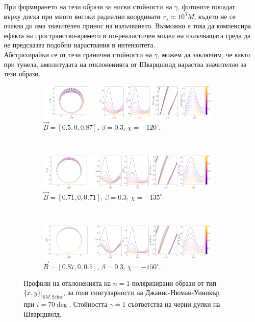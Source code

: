 При формирането на тези образи за ниски стойности на $\gamma$, фотоните попадат върху диска при много високи радиални координати $r_s\approx 10^3M$, където не се очаква да има значителен принос на излъчването. Възможно е това да компенсира ефекта на пространство-времето и по-реалистичен модел на излъчващата среда да \emph{не} предсказва подобни нараствания в интензитета. \\

Абстрахирайки се от тези гранични стойности на $\gamma$, можем да заключим, че както при тунела, амплитудата на отклоненията от Шварцшилд нараства значително за тези образи. 

\begin{figure}[!htb]
	\centering
	\begin{subfigure}{12cm}
		\hspace{-0.25cm}
		\includegraphics[scale = 0.13]{JNW_delta_fig_B_0.5_0.87_0_20_deg_r6_n1.png}
		\caption{$\vec{B} = [0.5, 0, 0.87]$, $\beta = 0.3$, $\chi = -120^\circ$.}
	\end{subfigure}\\
	\begin{subfigure}{12cm}
		\hspace{-0.25cm}
		\includegraphics[scale = 0.13]{JNW_delta_fig_B_0.71_0.71_0_20_deg_r6_n1.png}
		\caption{$\vec{B} = [0.71, 0, 0.71]$, $\beta = 0.3$, $\chi = -135^\circ$.}
	\end{subfigure}\\
	\begin{subfigure}{12cm}
		\hspace{-0.25cm}
		\includegraphics[scale = 0.13]{JNW_delta_fig_B_0.87_0.5_0_20_deg_r6_n1.png}
		\caption{$\vec{B} = [0.87, 0, 0.5]$, $\beta = 0.3$, $\chi = -150^\circ$.}
	\end{subfigure}
	\caption[Профили на отклоненията на $n = 1$ поляризирани образи oт тип $\{x,y\}\vert_{6M, \text{Schw}}$, за $i = 20\deg$ за голи сингуларности на Джанис-Нюман-Уиникър.]{\small Профили на отклоненията на $n = 1$ поляризирани образи от тип $\{x,y\}\vert_{6M, \text{Schw}}$, за голи сингуларности на Джанис-Нюман-Уиникър при $i = 70\deg$. Стойността $\gamma = 1$ съответства на черни дупки на Шварцшилд.} 
	\label{JNW_delta_r6_20_deg_n1}
\end{figure}

